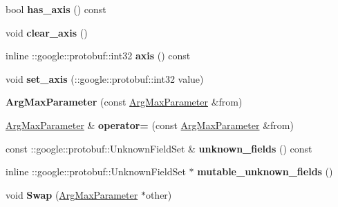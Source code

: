 \begin{DoxyCompactItemize}
bool {\bfseries has\+\_\+axis} () const
\item 
\mbox{\label{classcaffe_1_1_arg_max_parameter_ab908bcd39893275fe8f342c015d11823}} 
void {\bfseries clear\+\_\+axis} ()
\item 
\mbox{\label{classcaffe_1_1_arg_max_parameter_a552706ccea7b413f107dc35398a3f4c8}} 
inline \+::google\+::protobuf\+::int32 {\bfseries axis} () const
\item 
\mbox{\label{classcaffe_1_1_arg_max_parameter_a52ffce5d27f70edabf979332ff8d1c5d}} 
void {\bfseries set\+\_\+axis} (\+::google\+::protobuf\+::int32 value)
\item 
\mbox{\label{classcaffe_1_1_arg_max_parameter_a620713fe524646479cbd372adbd0d722}} 
{\bfseries Arg\+Max\+Parameter} (const \mbox{\hyperlink{classcaffe_1_1_arg_max_parameter}{Arg\+Max\+Parameter}} \&from)
\item 
\mbox{\label{classcaffe_1_1_arg_max_parameter_a2a0fb48f8c5aa636a5cc50f6384a8a43}} 
\mbox{\hyperlink{classcaffe_1_1_arg_max_parameter}{Arg\+Max\+Parameter}} \& {\bfseries operator=} (const \mbox{\hyperlink{classcaffe_1_1_arg_max_parameter}{Arg\+Max\+Parameter}} \&from)
\item 
\mbox{\label{classcaffe_1_1_arg_max_parameter_a7af6fe08f23a649b1082b461f228d67d}} 
const \+::google\+::protobuf\+::\+Unknown\+Field\+Set \& {\bfseries unknown\+\_\+fields} () const
\item 
\mbox{\label{classcaffe_1_1_arg_max_parameter_a413f4e3129edd8532a4c320e9d063a7f}} 
inline \+::google\+::protobuf\+::\+Unknown\+Field\+Set $\ast$ {\bfseries mutable\+\_\+unknown\+\_\+fields} ()
\item 
\mbox{\label{classcaffe_1_1_arg_max_parameter_ad77ce47f3768c6cf1608b6a421fe12bb}} 
void {\bfseries Swap} (\mbox{\hyperlink{classcaffe_1_1_arg_max_parameter}{Arg\+Max\+Parameter}} $\ast$other)
\item 
\mbox{\label{classcaffe_1_1_arg_max_parameter_a2f62ddabac9f2664502fd4b8a8236b45}} 

\end{DoxyCompactItemize}
